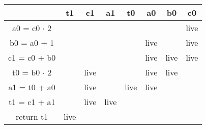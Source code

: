 
\begin{table}[H]
    \centering
    \begin{tabular}{|c|c|c|c|c|c|c|c|}
         \hline & t1 & c1 & a1 & t0 & a0 & b0 & c0 \\
         \hline a0 = c0 $\cdot$ 2 &  &  &  &  &  &  & live\\
         \hline b0 = a0 + 1 &  &  &  &  & live &  & live\\
         \hline c1 = c0 + b0 &  &  &  &  & live & live & live \\
         \hline t0 = b0 $\cdot$ 2&  & live &  &  & live & live & \\
         \hline a1 = t0 + a0 &  & live &  & live & live &  & \\
         \hline t1 = c1 + a1 &  & live & live &  &  &  & \\
         \hline return t1& live &  &  &  &  &  & \\
         \hline
    \end{tabular}
    \label{tab:my_label}
\end{table}
